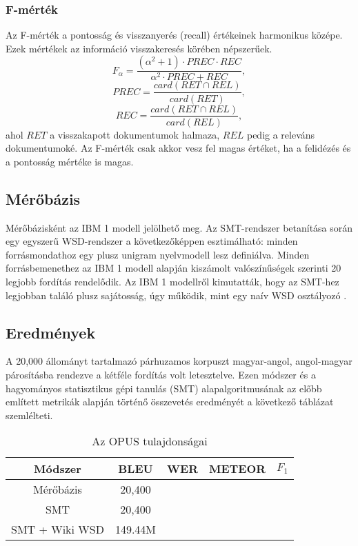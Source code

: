 \subsubsection{F-mérték}
Az F-mérték a pontosság és visszanyerés (recall) értékeinek harmonikus középe. Ezek mértékek az információ visszakeresés körében népszerűek. 
\begin{equation}
F_\alpha = \frac{(\alpha^2 + 1) \cdot PREC \cdot REC}{\alpha^2 \cdot PREC + REC},
\end{equation}
\begin{equation}
PREC = \frac{card(RET \cap REL)}{card(RET)},
\end{equation}
\begin{equation}
REC = \frac{card(RET \cap REL)}{card(REL)},
\end{equation}
ahol $RET$ a visszakapott dokumentumok halmaza, $REL$ pedig a releváns dokumentumoké. Az F-mérték csak akkor vesz fel magas értéket, ha a felidézés és a pontosság mértéke is magas.


\subsection{Mérőbázis}
Mérőbázisként az IBM 1 \cite{Collins} modell jelölhető meg. Az SMT-rendszer betanítása során egy egyszerű WSD-rendszer a következőképpen esztimálható: minden forrásmondathoz egy plusz unigram nyelvmodell lesz definiálva. Minden forrásbemenethez az IBM 1 modell alapján kiszámolt valószínűségek szerinti 20 legjobb fordítás rendelődik. Az IBM 1 modellről kimutatták, hogy az SMT-hez legjobban találó plusz sajátosság, úgy működik, mint egy naív WSD osztályozó \cite{Crego10local}.

\subsection{Eredmények}
A 20,000 állományt tartalmazó párhuzamos korpuszt magyar-angol, angol-magyar párosításba rendezve a kétféle fordítás volt letesztelve. Ezen módszer és a hagyományos statisztikus gépi tanulás (SMT) alapalgoritmusának az előbb említett metrikák alapján történő összevetés eredményét a következő táblázat szemlélteti.

\begin{table}[h!]
\centering
\normalsize
 \begin{tabular}{| c | c | c | c | c |} 
 \hline
 Módszer & BLEU & WER & METEOR & $F_1$ \\
 \hline\hline
 Mérőbázis & 20,400 \\
 \hline
 SMT & 20,400 \\ 
 
 SMT + Wiki WSD & 149.44M \\ 
 \hline
 \end{tabular}
 \caption{Az OPUS tulajdonságai}
\end{table}


